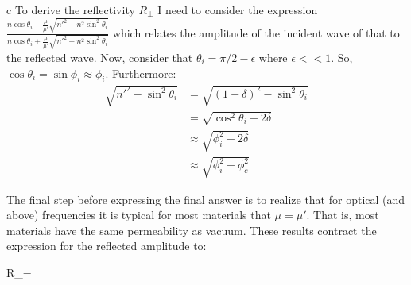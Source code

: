 \begin{homeworkProblem}
\begin{homeworkSection}{c}
To derive the reflectivity $R_\bot$ I need to consider the expression $\frac{n\cos\theta_i - \frac{\mu}{\mu'}\sqrt{n'^2-n^2\sin^2\theta_i}}{n\cos\theta_i+\frac{\mu}{\mu'}\sqrt{n'^2-n^2\sin^2\theta_i}}$ which relates the amplitude of the incident wave of that to the reflected wave. Now, consider that $\theta_i = \pi/2 - \epsilon$ where $\epsilon << 1 $. So, $\cos\theta_i = \sin\phi_i \approx \phi_i$. Furthermore:
\begin{align*}
\sqrt{n'^2-\sin^2\theta_i} &= \sqrt{(1-\delta)^2-\sin^2\theta_i} \\
& = \sqrt{\cos^2\theta_i - 2\delta} \\
& \approx \sqrt{\phi_i^2-2\delta} \\
& \approx \sqrt{\phi_i^2-\phi^2_c}
\end{align*}

The final step before expressing the final answer is to realize that for optical (and above) frequencies it is typical for most materials that $\mu = \mu'$. That is, most materials have the same permeability as vacuum. These results contract the expression for the reflected amplitude to: 
\\

\begin{problemAnswer}
{
R_\bot = 
}
\end{problemAnswer}
\end{homeworkSection}
\end{homeworkProblem}
